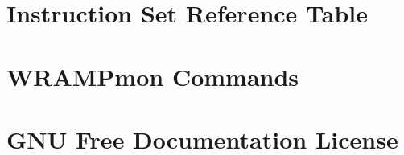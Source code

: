 \documentclass[a4paper]{book}
\begin{document}
\chapter{Instruction Set Reference Table}
\label{appendix:instrsm}
\addtolength{\hoffset}{-1cm}
\addtolength{\textwidth}{1cm}

\chapter{WRAMPmon Commands}
\label{appendix:wrampmon}


\chapter{GNU Free Documentation License}
\label{appendix:license}

\end{document}
